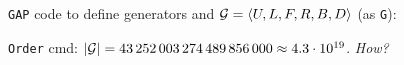 
\begin{slide}
    \texttt{GAP} code to define generators and $\mathcal{G} = \langle U,L,F,R,B,D \rangle$ (as \texttt{G}):

    {\footnotesize} \pause

    \texttt{Order} cmd: $|\mathcal{G}| = 43\,252\,003\,274\,489\,856\,000 \approx 4.3 \cdot 10^{19}$. \textit{How?}
\end{slide}









